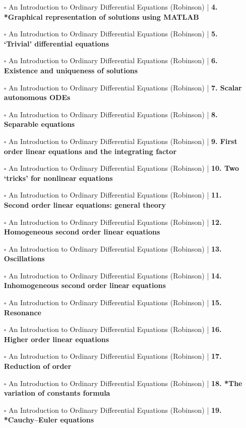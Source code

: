 \documentclass[a4, landscape, 12pt]{article}
\newcommand{\checkbox}{$\square$}%
\begin{document}
\begin{itemize}
{}
\item [\checkbox] An Introduction to Ordinary Differential Equations (Robinson)  | \textbf{4. *Graphical representation of solutions using MATLAB
}
\item [\checkbox] An Introduction to Ordinary Differential Equations (Robinson)  | \textbf{5. ‘Trivial’ differential equations
}
\item [\checkbox] An Introduction to Ordinary Differential Equations (Robinson)  | \textbf{6. Existence and uniqueness of solutions
}
\item [\checkbox] An Introduction to Ordinary Differential Equations (Robinson)  | \textbf{7. Scalar autonomous ODEs
}
\item [\checkbox] An Introduction to Ordinary Differential Equations (Robinson)  | \textbf{8. Separable equations
}
\item [\checkbox] An Introduction to Ordinary Differential Equations (Robinson)  | \textbf{9. First order linear equations and the integrating factor
}
\item [\checkbox] An Introduction to Ordinary Differential Equations (Robinson)  | \textbf{10. Two ‘tricks’ for nonlinear equations
}
\item [\checkbox] An Introduction to Ordinary Differential Equations (Robinson)  | \textbf{11. Second order linear equations: general theory
}
\item [\checkbox] An Introduction to Ordinary Differential Equations (Robinson)  | \textbf{12. Homogeneous second order linear equations
}
\item [\checkbox] An Introduction to Ordinary Differential Equations (Robinson)  | \textbf{13. Oscillations
}
\item [\checkbox] An Introduction to Ordinary Differential Equations (Robinson)  | \textbf{14. Inhomogeneous second order linear equations
}
\item [\checkbox] An Introduction to Ordinary Differential Equations (Robinson)  | \textbf{15. Resonance
}
\item [\checkbox] An Introduction to Ordinary Differential Equations (Robinson)  | \textbf{16. Higher order linear equations
}
\item [\checkbox] An Introduction to Ordinary Differential Equations (Robinson)  | \textbf{17. Reduction of order
}
\item [\checkbox] An Introduction to Ordinary Differential Equations (Robinson)  | \textbf{18. *The variation of constants formula
}
\item [\checkbox] An Introduction to Ordinary Differential Equations (Robinson)  | \textbf{19. *Cauchy–Euler equations
}
\end{itemize}
\end{document}
